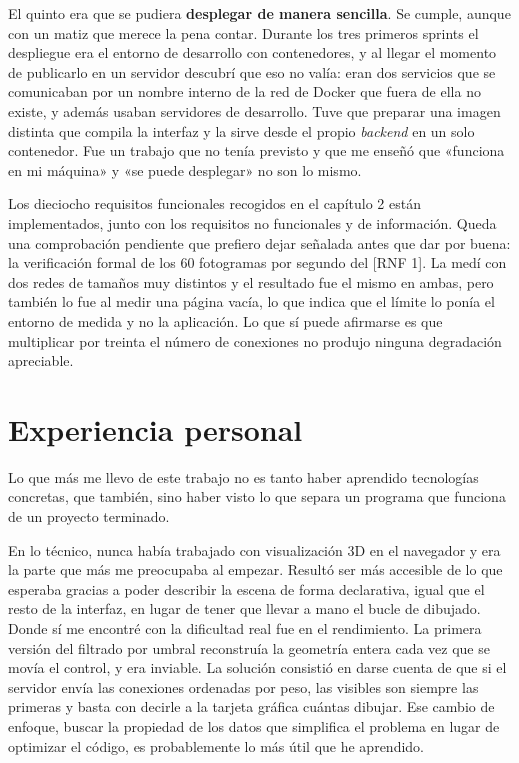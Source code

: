 El quinto era que se pudiera \textbf{desplegar de manera sencilla}. Se cumple, aunque con un matiz que
merece la pena contar. Durante los tres primeros sprints el despliegue era el entorno de desarrollo
con contenedores, y al llegar el momento de publicarlo en un servidor descubrí que eso no valía: eran
dos servicios que se comunicaban por un nombre interno de la red de Docker que fuera de ella no
existe, y además usaban servidores de desarrollo. Tuve que preparar una imagen distinta que compila
la interfaz y la sirve desde el propio \textit{backend} en un solo contenedor. Fue un trabajo que no
tenía previsto y que me enseñó que «funciona en mi máquina» y «se puede desplegar» no son lo mismo.

Los dieciocho requisitos funcionales recogidos en el capítulo 2 están implementados, junto con los
requisitos no funcionales y de información. Queda una comprobación pendiente que prefiero dejar
señalada antes que dar por buena: la verificación formal de los 60 fotogramas por segundo del
[RNF 1]. La medí con dos redes de tamaños muy distintos y el resultado fue el mismo en ambas, pero
también lo fue al medir una página vacía, lo que indica que el límite lo ponía el entorno de medida y
no la aplicación. Lo que sí puede afirmarse es que multiplicar por treinta el número de conexiones no
produjo ninguna degradación apreciable.

\section{Experiencia personal}

Lo que más me llevo de este trabajo no es tanto haber aprendido tecnologías concretas, que también,
sino haber visto lo que separa un programa que funciona de un proyecto terminado.

En lo técnico, nunca había trabajado con visualización 3D en el navegador y era la parte que más me
preocupaba al empezar. Resultó ser más accesible de lo que esperaba gracias a poder describir la
escena de forma declarativa, igual que el resto de la interfaz, en lugar de tener que llevar a mano el
bucle de dibujado. Donde sí me encontré con la dificultad real fue en el rendimiento. La primera
versión del filtrado por umbral reconstruía la geometría entera cada vez que se movía el control, y
era inviable. La solución consistió en darse cuenta de que si el servidor envía las conexiones
ordenadas por peso, las visibles son siempre las primeras y basta con decirle a la tarjeta gráfica
cuántas dibujar. Ese cambio de enfoque, buscar la propiedad de los datos que simplifica el problema
en lugar de optimizar el código, es probablemente lo más útil que he aprendido.

